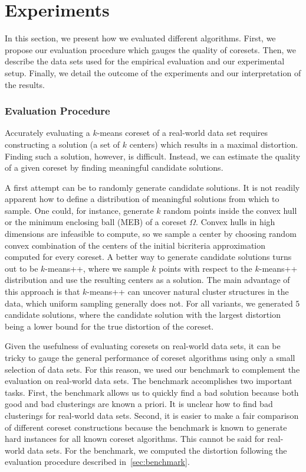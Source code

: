 


\section{Experiments} \label{sec:experiments}
In this section, we present how we evaluated different algorithms. First, we propose our evaluation procedure which gauges the quality of coresets. Then, we describe the data sets used for the empirical evaluation and our experimental setup. Finally, we detail the outcome of the experiments and our interpretation of the results.

\subsubsection*{Evaluation Procedure}
\label{sec:evaluation-procedure}
Accurately evaluating a $k$-means coreset of a real-world data set requires constructing a solution (a set of $k$ centers) which results in a maximal distortion. Finding such a solution, however, is difficult. Instead, we can estimate the quality of a given coreset by finding meaningful candidate solutions. 

A first attempt can be to randomly generate candidate solutions. It is not readily apparent how to define a distribution of meaningful solutions from which to sample. One could, for instance, generate $k$ random points inside the convex hull or the minimum enclosing ball (MEB) of a coreset $\Omega$. Convex hulls in high dimensions are infeasible to compute, so we sample a center by choosing random convex combination of the centers of the initial bicriteria approximation computed for every coreset. 
A better way to generate candidate solutions turns out to be $k$-means++, where we sample $k$ points with respect to the $k$-means++ distribution and use the resulting centers as a solution. The main advantage of this approach is that $k$-means++ can uncover natural cluster structures in the data, which uniform sampling generally does not.
For all variants, we generated $5$ candidate solutions, where the candidate solution with the largest distortion being a lower bound for the true distortion of the coreset.

Given the usefulness of evaluating coresets on real-world data sets, it can be tricky to gauge the general performance of coreset algorithms using only a small selection of data sets. For this reason, we used our benchmark to complement the evaluation on real-world data sets. The benchmark accomplishes two important tasks. First, the benchmark allows us to quickly find a bad solution because both good and bad clusterings are known a priori. It is unclear how to find bad clusterings for real-world data sets. Second, it is easier to make a fair comparison of different coreset constructions because the benchmark is known to generate hard instances for all known coreset algorithms. This cannot be said for real-world data sets. For the benchmark, we computed the distortion following the evaluation procedure described in~\cref{sec:benchmark}. 

